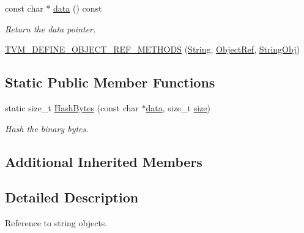 \begin{DoxyCompactItemize}
const char $\ast$ \hyperlink{classtvm_1_1runtime_1_1String_a7bf6b73710e93d238712be0c9d4143b0}{data} () const 
\begin{DoxyCompactList}\small\item\em Return the data pointer. \end{DoxyCompactList}\item 
\hyperlink{classtvm_1_1runtime_1_1String_a9b55a67ee4dc15ac77d4eab01f15b9d8}{T\+V\+M\+\_\+\+D\+E\+F\+I\+N\+E\+\_\+\+O\+B\+J\+E\+C\+T\+\_\+\+R\+E\+F\+\_\+\+M\+E\+T\+H\+O\+DS} (\hyperlink{classtvm_1_1runtime_1_1String}{String}, \hyperlink{classtvm_1_1runtime_1_1ObjectRef}{Object\+Ref}, \hyperlink{classtvm_1_1runtime_1_1StringObj}{String\+Obj})
\end{DoxyCompactItemize}
\subsection*{Static Public Member Functions}
\begin{DoxyCompactItemize}
\item 
static size\+\_\+t \hyperlink{classtvm_1_1runtime_1_1String_a0ea0aa1d24073721ee7bf9bd5d23c53a}{Hash\+Bytes} (const char $\ast$\hyperlink{classtvm_1_1runtime_1_1String_a7bf6b73710e93d238712be0c9d4143b0}{data}, size\+\_\+t \hyperlink{classtvm_1_1runtime_1_1String_a44788bd2440eb4ebbada370314536243}{size})
\begin{DoxyCompactList}\small\item\em Hash the binary bytes. \end{DoxyCompactList}\end{DoxyCompactItemize}
\subsection*{Additional Inherited Members}


\subsection{Detailed Description}
Reference to string objects. 


